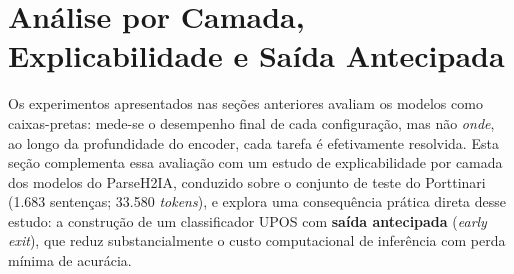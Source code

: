 %

\section{Análise por Camada, Explicabilidade e Saída Antecipada}
\label{sec:analise_camadas}

Os experimentos apresentados nas seções anteriores avaliam os modelos como caixas-pretas:
mede-se o desempenho final de cada configuração, mas não \emph{onde}, ao longo da profundidade
do encoder, cada tarefa é efetivamente resolvida. Esta seção complementa essa avaliação com um
estudo de explicabilidade por camada dos modelos do ParseH2IA, conduzido sobre o conjunto de
teste do Porttinari (1.683 sentenças; 33.580 \textit{tokens}), e explora uma consequência
prática direta desse estudo: a construção de um classificador UPOS com \textbf{saída antecipada}
(\textit{early exit}), que reduz substancialmente o custo computacional de inferência com perda
mínima de acurácia.

